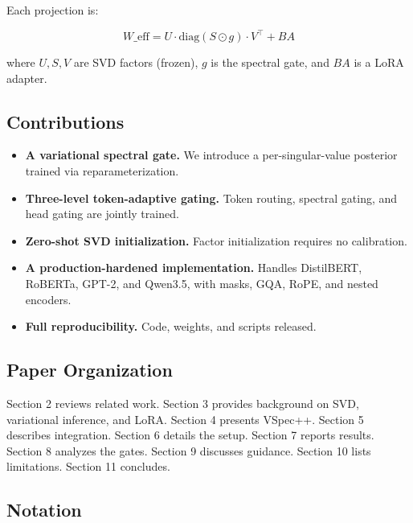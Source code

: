Each projection is:

\[
W\_\text{eff} = U \cdot \text{diag}(S \odot g) \cdot V^\top + B A
\tag{1.6}
\]

where $U, S, V$ are SVD factors (frozen), $g$ is the spectral gate, and 
$B A$ is a LoRA adapter.

\subsection{Contributions}

\begin{itemize}
\item \textbf{A variational spectral gate.} We introduce a per-singular-value
  posterior trained via reparameterization.
\item \textbf{Three-level token-adaptive gating.} Token routing, spectral gating,
  and head gating are jointly trained.
\item \textbf{Zero-shot SVD initialization.} Factor initialization requires no
  calibration.
\item \textbf{A production-hardened implementation.} Handles DistilBERT, RoBERTa,
  GPT-2, and Qwen3.5, with masks, GQA, RoPE, and nested encoders.
\item \textbf{Full reproducibility.} Code, weights, and scripts released.

\end{itemize}
\subsection{Paper Organization}

Section 2 reviews related work. Section 3 provides background on SVD, 
variational inference, and LoRA. Section 4 presents VSpec++. Section 5 
describes integration. Section 6 details the setup. Section 7 reports 
results. Section 8 analyzes the gates. Section 9 discusses guidance. 
Section 10 lists limitations. Section 11 concludes.



\subsection{Notation}

